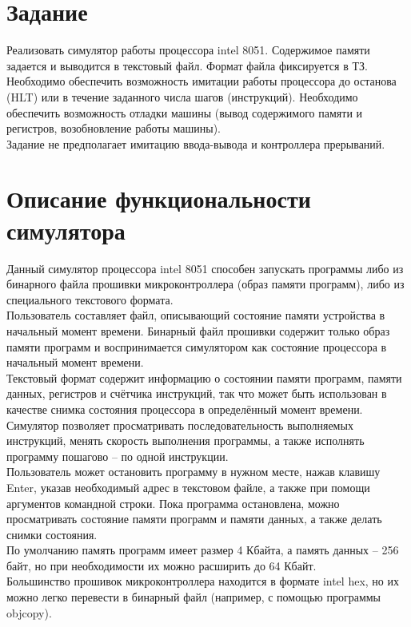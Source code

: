 





\large



\setcounter{page}{2}

\tableofcontents
\newpage


\section{Задание}
Реализовать симулятор работы процессора intel 8051. Содержимое памяти задается и выводится в текстовый файл. Формат файла фиксируется в ТЗ. \\
Необходимо обеспечить возможность имитации работы процессора до останова (HLT) или в течение заданного числа шагов (инструкций). Необходимо обеспечить возможность отладки машины (вывод содержимого памяти и регистров, возобновление работы машины). \\
Задание не предполагает имитацию ввода-вывода и контроллера прерываний.

\section{Описание функциональности симулятора}
Данный симулятор процессора intel 8051 способен запускать программы либо из бинарного файла прошивки микроконтроллера (образ памяти программ), либо из специального текстового формата. \\
Пользователь составляет файл, описывающий состояние памяти устройства в начальный момент времени. Бинарный файл прошивки содержит только образ памяти программ и воспринимается симулятором как состояние процессора в начальный момент времени. \\
Текстовый формат содержит информацию о состоянии памяти программ, памяти данных, регистров и счётчика инструкций, так что может быть использован в качестве снимка состояния процессора в определённый момент времени. \\
Симулятор позволяет просматривать последовательность выполняемых инструкций, менять скорость выполнения программы, а также исполнять программу пошагово -- по одной инструкции. \\
Пользователь может остановить программу в нужном месте, нажав клавишу Enter, указав необходимый адрес в текстовом файле, а также при помощи аргументов командной строки. Пока программа остановлена, можно просматривать состояние памяти программ и памяти данных, а также делать снимки состояния. \\
По умолчанию память программ имеет размер 4 Кбайта, а память данных -- 256 байт, но при необходимости их можно расширить до 64 Кбайт. \\
Большинство прошивок микроконтроллера находится в формате intel hex, но их можно легко перевести в бинарный файл (например, с помощью программы objcopy).

